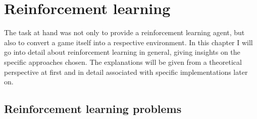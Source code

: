 \chapter{Reinforcement learning}

\label{ch:RL} 

\newcommand{\inlinecode}[1]{\colorbox{evenmorelightgray}{\lstinline[basicstyle=\ttfamily\color{black}]{#1}}}


The task at hand was not only to provide a reinforcement learning agent, but also to convert a game itself into a respective environment. In this chapter I will go into detail about reinforcement learning in general, giving insights on the specific approaches chosen. The explanations will be given from a theoretical perspective at first and in detail associated with specific implementations later on.


\section{Reinforcement learning problems}

